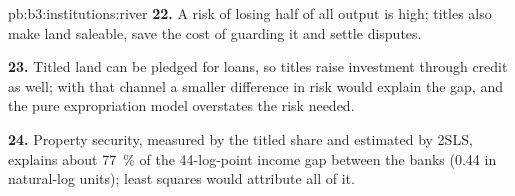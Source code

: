 \begin{solution}{pb:b3:institutions:river}
\textbf{22.} A risk of losing half of all output is high; titles also make land
saleable, save the cost of guarding it and settle disputes.

\textbf{23.} Titled land can be pledged for loans, so titles raise investment through
credit as well; with that channel a smaller difference in risk would explain the gap,
and the pure expropriation model overstates the risk needed.

\textbf{24.} Property security, measured by the titled share and estimated by 2SLS, explains about 77~\% of the
44-log-point income gap between the banks (0.44 in natural-log units); least squares would attribute all of it.
\end{solution}
